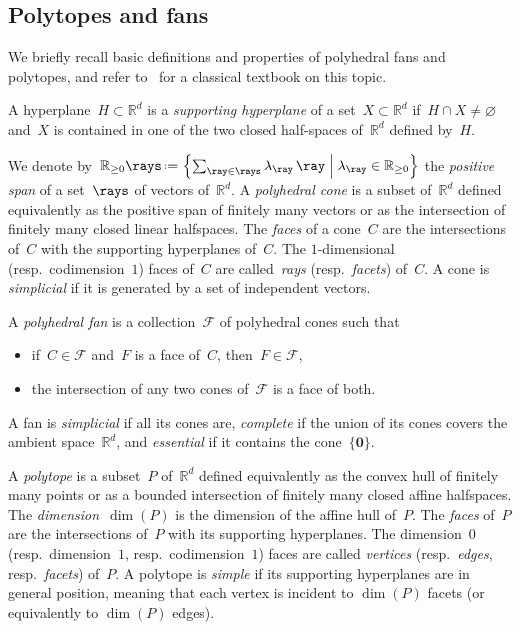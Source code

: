 \documentclass{amsart}
\theoremstyle{definition}
\newcommand{\R}{\mathbb{R}} %
\renewcommand{\b}[1]{{\boldsymbol{#1}}} %
\newcommand{\set}[2]{\left\{ #1 \;\middle|\; #2 \right\}} %
\newcommand{\eqdef}{\mbox{\,\raisebox{0.2ex}{\scriptsize\ensuremath{\mathrm:}}\ensuremath{=}\,}} %
\newcommand{\darkblue}{\color{darkblue}} %
\newcommand{\defn}[1]{\textsl{\darkblue #1}} %
\newcommand{\Fan}{\mathcal{F}} %
\begin{document}

\subsection{Polytopes and fans}

We briefly recall basic definitions and properties of polyhedral fans and polytopes, and refer to~\cite{Ziegler-polytopes} for a classical textbook on this topic.

A hyperplane~$H \subset \R^d$ is a \defn{supporting hyperplane} of a set~$X \subset \R^d$ if~$H \cap X \ne \varnothing$ and~$X$ is contained in one of the two closed half-spaces of~$\R^d$ defined by~$H$.

We denote by~$\R_{\ge0}\rays \eqdef \set{\sum_{\ray \in \rays} \lambda_{\ray} \, \ray}{\lambda_{\ray} \in \R_{\ge0}}$ the \defn{positive span} of a set~$\rays$ of vectors of~$\R^d$.
A \defn{polyhedral cone} is a subset of~$\R^d$ defined equivalently as the positive span of finitely many vectors or as the intersection of finitely many closed linear halfspaces.
The \defn{faces} of a cone~$C$ are the intersections of~$C$ with the supporting hyperplanes of~$C$.
The $1$-dimensional (resp.~codimension~$1$) faces of~$C$ are called~\defn{rays} (resp.~\defn{facets}) of~$C$.
A cone is \defn{simplicial} if it is generated by a set of independent vectors.

A \defn{polyhedral fan} is a collection~$\Fan$ of polyhedral cones such that
\begin{itemize}
\item if~$C \in \Fan$ and~$F$ is a face of~$C$, then~$F \in \Fan$,
\item the intersection of any two cones of~$\Fan$ is a face of both.
\end{itemize}
A fan is \defn{simplicial} if all its cones are, \defn{complete} if the union of its cones covers the ambient space~$\R^d$, and \defn{essential} if it contains the cone~$\{\b{0}\}$.

A \defn{polytope} is a subset~$P$ of~$\R^d$ defined equivalently as the convex hull of finitely many points or as a bounded intersection of finitely many closed affine halfspaces.
The \defn{dimension}~$\dim(P)$ is the dimension of the affine hull of~$P$.
The \defn{faces} of~$P$ are the intersections of~$P$ with its supporting hyperplanes.
The dimension~$0$ (resp.~dimension~$1$, resp.~codimension~$1$) faces are called \defn{vertices} (resp.~\defn{edges}, resp.~\defn{facets}) of~$P$.
A polytope is \defn{simple} if its supporting hyperplanes are in general position, meaning that each vertex is incident to $\dim(P)$ facets (or equivalently to $\dim(P)$ edges).
\end{document}
